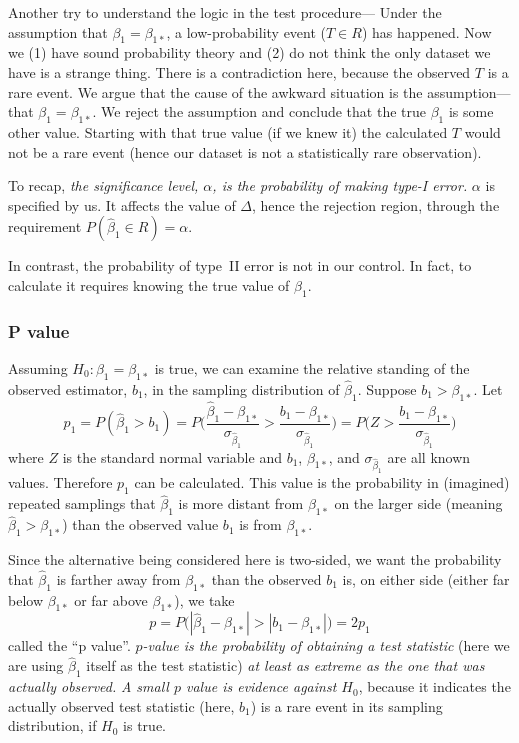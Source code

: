 \documentclass[12pt]{article}
\begin{document}
Another try to understand the logic in the test procedure---%
Under the assumption that
$\beta_1 = \beta_{1*}$, a low-probability event
(\ie $T \in R$) has happened.
Now we (1) have sound probability theory
and (2) do not think the only dataset we have is a strange thing.
There is a contradiction here,
because the observed $T$ is a rare event.
We argue that the cause of the awkward situation is the assumption---%
that $\beta_1 = \beta_{1*}$.
We reject the assumption and conclude that
the true $\beta_1$ is some other value.
Starting with that true value (if we knew it)
the calculated $T$ would not be a rare event
(hence our dataset is not a statistically rare observation).

To recap,
\emph{the significance level, $\alpha$,
is the probability of making type-I error.}
$\alpha$ is specified by us.
It affects the value of $\Delta$, hence
the rejection region, through the requirement
$P(\hat\beta_1 \in R) = \alpha$.

In contrast,
the probability of type~II error is not in our control.
In fact, to calculate it requires knowing the true value of $\beta_1$.

\subsubsection{P value}

Assuming $H_0: \beta_1 = \beta_{1*}$ is true,
we can examine the relative standing of the observed estimator,
$b_1$, in the sampling distribution of $\hat\beta_1$.
Suppose $b_1 > \beta_{1*}$.
Let
\[
p_1
= P(\hat\beta_1 > b_1)
= P\biggl(\frac{\hat\beta_1 - \beta_{1*}}{\sigma_{\hat\beta_1}}
    > \frac{b_1 - \beta_{1*}}{\sigma_{\hat\beta_1}}\biggr)
= P\biggl(Z > \frac{b_1 - \beta_{1*}}{\sigma_{\hat\beta_1}}\biggr)
\]
where $Z$ is the standard normal variable
and $b_1$, $\beta_{1*}$, and $\sigma_{\hat\beta_1}$
are all known values.
Therefore $p_1$ can be calculated.
This value is the probability in (imagined) repeated samplings
that $\hat\beta_1$ is more distant from $\beta_{1*}$
on the larger side (meaning $\hat\beta_1 > \beta_{1*}$)
than the observed value $b_1$ is from $\beta_{1*}$.

Since the alternative being considered here is two-sided,
we want the probability that $\hat\beta_1$ is farther away from
$\beta_{1*}$ than the observed $b_1$ is, on either side
(either far below $\beta_{1*}$ or far above $\beta_{1*}$),
we take
\[
p = P\bigl(|\hat\beta_1 - \beta_{1*}| > |b_1 - \beta_{1*}|\bigr)
  = 2p_1
\]
called the ``p value''.
\emph{$p$-value is the probability of obtaining a test statistic}
(here we are using $\hat\beta_1$ itself as the test statistic)
\emph{at least as extreme as the one that was actually observed.}
\emph{A small $p$ value is evidence against $H_0$},
because it indicates the actually observed test statistic
(here, $b_1$) is a rare event in its sampling distribution,
if $H_0$ is true.
\end{document}
